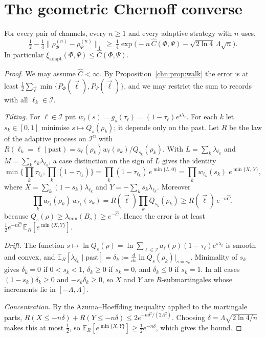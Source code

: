 \section{The geometric Chernoff converse}\label{chn:sec:converse}

\begin{theorem}\label{chn:thm:main}
For every pair of channels, every $n\ge1$ and every adaptive strategy with $n$ uses,
\[
\tfrac12-\tfrac14\big\|\rho^{(n)}_\Phi-\rho^{(n)}_\Psi\big\|_1\ \ge\ \tfrac14\exp\!\Big(-n\,\widehat C(\Phi,\Psi)-\sqrt{2\ln4}\,\Lambda\sqrt n\Big).
\]
In particular $\xi_{\mathrm{adapt}}(\Phi,\Psi)\le\widehat C(\Phi,\Psi)$.
\end{theorem}

\begin{proof}
We may assume $\widehat C<\infty$. By Proposition~\ref{chn:prop:walk} the error is at least $\tfrac12\sum_{\vec\ell}\min\{P_\Phi(\vec\ell),P_\Psi(\vec\ell)\}$, and we may restrict the sum to records with all $\ell_k\in\mathcal I$.

\emph{Tilting.} For $\ell\in\mathcal I$ put $w_\ell(s)=g_s(\tau_\ell)=(1-\tau_\ell)e^{s\lambda_\ell}$. For each $k$ let $s_k\in[0,1]$ minimise $s\mapsto Q_s(\rho_k)$; it depends only on the past. Let $R$ be the law of the adaptive process on $\mathcal I^n$ with $R(\ell_k=\ell\mid\text{past})=a_\ell(\rho_k)w_\ell(s_k)/Q_{s_k}(\rho_k)$. With $L=\sum_k\lambda_{\ell_k}$ and $M=\sum_ks_k\lambda_{\ell_k}$, a case distinction on the sign of $L$ gives the identity
\[
\min\Big\{\prod_k\tau_{\ell_k},\prod_k(1-\tau_{\ell_k})\Big\}=\prod_k(1-\tau_{\ell_k})\,e^{\min\{L,0\}}=\prod_kw_{\ell_k}(s_k)\;e^{\min\{X,\,Y\}},
\]
where $X=\sum_k(1-s_k)\lambda_{\ell_k}$ and $Y=-\sum_ks_k\lambda_{\ell_k}$. Moreover
\[
\prod_ka_{\ell_k}(\rho_k)\,w_{\ell_k}(s_k)=R(\vec\ell)\prod_kQ_{s_k}(\rho_k)\ge R(\vec\ell)\,e^{-n\widehat C},
\]
because $Q_s(\rho)\ge\lambda_{\min}(B_s)\ge e^{-\widehat C}$. Hence the error is at least $\tfrac12e^{-n\widehat C}\,\mathbb E_R[e^{\min\{X,Y\}}]$.

\emph{Drift.} The function $s\mapsto\ln Q_s(\rho)=\ln\sum_{\ell\in\mathcal I}a_\ell(\rho)(1-\tau_\ell)e^{s\lambda_\ell}$ is smooth and convex, and $\mathbb E_R[\lambda_{\ell_k}\mid\text{past}]=\delta_k:=\frac{d}{ds}\ln Q_s(\rho_k)|_{s=s_k}$. Minimality of $s_k$ gives $\delta_k=0$ if $0<s_k<1$, $\delta_k\ge0$ if $s_k=0$, and $\delta_k\le0$ if $s_k=1$. In all cases $(1-s_k)\delta_k\ge0$ and $-s_k\delta_k\ge0$, so $X$ and $Y$ are $R$-submartingales whose increments lie in $[-\Lambda,\Lambda]$.

\emph{Concentration.} By the Azuma--Hoeffding inequality \cite{Azuma1967} applied to the martingale parts, $R(X\le-n\delta)+R(Y\le-n\delta)\le2e^{-n\delta^2/(2\Lambda^2)}$. Choosing $\delta=\Lambda\sqrt{2\ln4/n}$ makes this at most $\tfrac12$, so $\mathbb E_R[e^{\min\{X,Y\}}]\ge\tfrac12e^{-n\delta}$, which gives the bound.
\end{proof}

